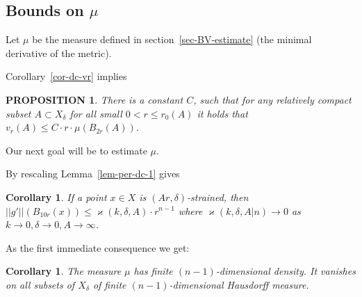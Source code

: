 \documentclass[12pt,leqno]{amsart}
\numberwithin{equation}{section}
\newtheorem{lem}[thm]{Lemma}
\newtheorem{cor}[thm]{Corollary}
\newtheorem{prop}[thm]{PROPOSITION}
\theoremstyle{definition}
\theoremstyle{remark}
\newcommand{\curv}{\mathop{\rm curv}}
\begin{document}
\subsection{Bounds on $\mu$}

 Let
 $\mu$ be the measure defined in  section~\ref{sec-BV-estimate}
 (the minimal derivative of the metric).





Corollary~\ref{cor-dc-vr} implies

 \begin{prop} \label{mainalex}
 There is a constant $C$,
 such that  for any relatively compact subset $A\subset X_\delta$ for all small
 $0<r\leq r_0 (A)$  it holds that  $v_r (A) \leq C \cdot r\cdot \mu  ( B_{2r} (A))$.
 \end{prop}

Our next goal will be to estimate $\mu$.



By rescaling Lemma~\ref{lem-per-dc-1} gives

 \begin{cor}  \label{ballmeasure}
 If a point $x\in X$ is $(Ar,\delta )$-strained, then $||g'|| (B_{10r} (x) ) \leq \varkappa(k,\delta,A)  \cdot r^{n-1}$ where $\varkappa(k,\delta,A|n)\to 0$ as $k\to 0, \delta\to 0,A\to\infty$.
 \end{cor}



As the first immediate consequence we get:

\begin{cor}\label{cor-n-1-density}
The measure $\mu$ has finite $(n-1)$-dimensional density. It vanishes on all subsets of $X_\delta$ of finite $(n-1)$-dimensional
Hausdorff measure.
\end{cor}
\end{document}
